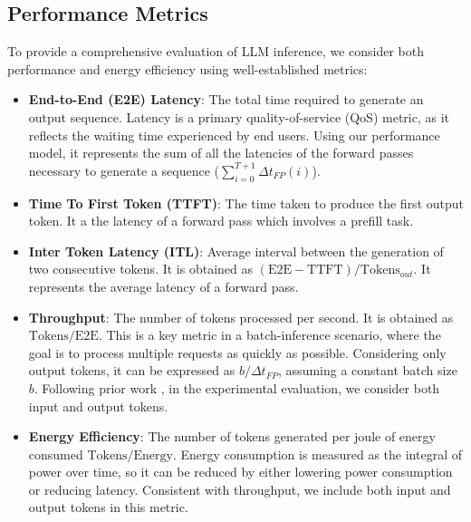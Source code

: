 \subsection{Performance Metrics}
\label{chap:methods:sec:metrics}
To provide a comprehensive evaluation of LLM inference, we consider both performance and energy efficiency using well-established metrics:
\begin{itemize}
    \item \textbf{End-to-End (E2E) Latency}: The total time required to generate an output sequence. Latency is a primary quality-of-service (QoS) metric, as it reflects the waiting time experienced by end users. Using our performance model, it represents the sum of all the latencies of the forward passes necessary to generate a sequence ($\sum_{i=0}^{T+1} \Delta t_{FP}(i)$).
    \item \textbf{Time To First Token (TTFT)}: The time  taken to produce the first output token. It a the latency of a forward pass which involves a prefill task.
    \item \textbf{Inter Token Latency (ITL)}: Average interval between the generation of two consecutive tokens. It is obtained as $(\text{E2E}-\text{TTFT})/\text{Tokens}_{out}$. It represents the average latency of a forward pass.
    \item \textbf{Throughput}: The number of tokens processed per second. It is obtained as $\text{Tokens}/\text{E2E}$. This is a key metric in a batch-inference scenario, where the goal is to process multiple requests as quickly as possible.
    Considering only output tokens, it can be expressed as $b/\Delta t_{FP}$, assuming a constant batch size $b$. Following prior work \cite{LLMInfbench}, in the experimental evaluation, we consider both input and output tokens.
    \item \textbf{Energy Efficiency}: The number of tokens generated per joule of energy consumed $\text{Tokens}/\text{Energy}$. Energy consumption is measured as the integral of power over time, so it can be reduced by either lowering power consumption or reducing latency. Consistent with throughput, we include both input and output tokens in this metric.
\end{itemize}